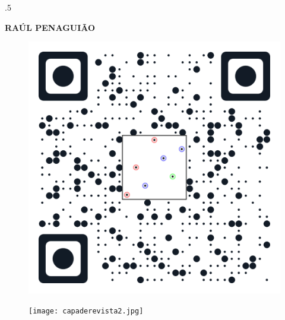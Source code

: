 \documentclass[margin, 10pt]{res} %
\begin{document}

\moveleft.5\hoffset\centerline{\large\bf RA\'UL PENAGUI\~AO} %

\begin{figure}
\centering
\begin{minipage}{.5\textwidth}
  \centering
  \includegraphics[width=.7\linewidth]{websiteQRcode.png}
\end{minipage}%
\begin{minipage}{.5\textwidth}
  \centering
  \texttt{[image: capaderevista2.jpg]}
\end{minipage}
\end{figure}


 
\end{document}
